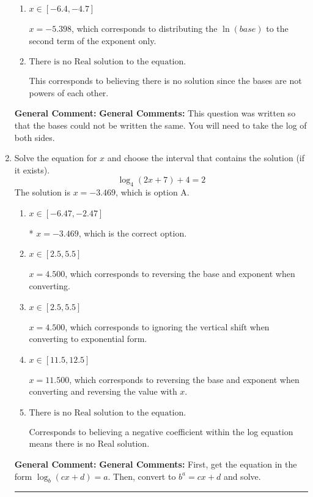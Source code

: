 \documentclass{extbook}[14pt]
\newcommand{\litem}[1]{\item #1

\rule{\textwidth}{0.4pt}}
\begin{document}
\begin{enumerate}
{\begin{enumerate}[label=\Alph*.]
$x = 1.400$, which corresponds to solving the numerators as equal while ignoring the bases are different.
\item \( x \in [-6.4, -4.7] \)

$x = -5.398$, which corresponds to distributing the $\ln(base)$ to the second term of the exponent only.
\item \( \text{There is no Real solution to the equation.} \)

This corresponds to believing there is no solution since the bases are not powers of each other.
\end{enumerate}

\textbf{General Comment:} \textbf{General Comments:} This question was written so that the bases could not be written the same. You will need to take the log of both sides.
}
\litem{
Solve the equation for $x$ and choose the interval that contains the solution (if it exists).
\[ \log_{4}{(2x+7)}+4 = 2 \]The solution is \( x = -3.469 \), which is option A.\begin{enumerate}[label=\Alph*.]
\item \( x \in [-6.47, -2.47] \)

* $x = -3.469$, which is the correct option.
\item \( x \in [2.5, 5.5] \)

$x = 4.500$, which corresponds to reversing the base and exponent when converting.
\item \( x \in [2.5, 5.5] \)

$x = 4.500$, which corresponds to ignoring the vertical shift when converting to exponential form.
\item \( x \in [11.5, 12.5] \)

$x = 11.500$, which corresponds to reversing the base and exponent when converting and reversing the value with $x$.
\item \( \text{There is no Real solution to the equation.} \)

Corresponds to believing a negative coefficient within the log equation means there is no Real solution.
\end{enumerate}

\textbf{General Comment:} \textbf{General Comments:} First, get the equation in the form $\log_b{(cx+d)} = a$. Then, convert to $b^a = cx+d$ and solve.
}
\end{enumerate}
\end{document}
